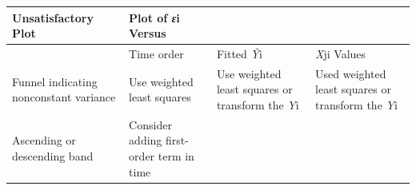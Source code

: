 \documentclass[
  10pt,
]{krantz}
\begin{document}
\begin{longtable}[]{@{}llll@{}}
\toprule
\begin{minipage}[b]{0.14\columnwidth}\raggedright
Unsatisfactory Plot\strut
\end{minipage} & \begin{minipage}[b]{0.20\columnwidth}\raggedright
Plot of \emph{ε}i Versus\strut
\end{minipage} & \begin{minipage}[b]{0.27\columnwidth}\raggedright
\strut
\end{minipage} & \begin{minipage}[b]{0.28\columnwidth}\raggedright
\strut
\end{minipage}\tabularnewline
\midrule
\endhead
\begin{minipage}[t]{0.14\columnwidth}\raggedright
\strut
\end{minipage} & \begin{minipage}[t]{0.20\columnwidth}\raggedright
Time order\strut
\end{minipage} & \begin{minipage}[t]{0.27\columnwidth}\raggedright
Fitted \emph{Ŷ}i\strut
\end{minipage} & \begin{minipage}[t]{0.28\columnwidth}\raggedright
\emph{X}ji Values\strut
\end{minipage}\tabularnewline
\begin{minipage}[t]{0.14\columnwidth}\raggedright
Funnel indicating nonconstant variance\strut
\end{minipage} & \begin{minipage}[t]{0.20\columnwidth}\raggedright
Use weighted least squares\strut
\end{minipage} & \begin{minipage}[t]{0.27\columnwidth}\raggedright
Use weighted least squares or transform the \emph{Y}i\strut
\end{minipage} & \begin{minipage}[t]{0.28\columnwidth}\raggedright
Used weighted least squares or transform the \emph{Y}i\strut
\end{minipage}\tabularnewline
\begin{minipage}[t]{0.14\columnwidth}\raggedright
Ascending or descending band\strut
\end{minipage} & \begin{minipage}[t]{0.20\columnwidth}\raggedright
Consider adding first-order term in time\strut
\end{minipage} & \begin{minipage}[t]{0.27\columnwidth}\raggedright

\end{minipage}
\end{longtable}
\end{document}

